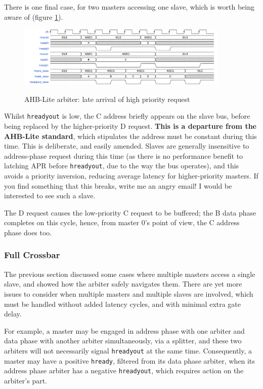 \documentclass[notitlepage]{article}
\begin{document}
There is one final case, for two masters accessing one slave, which is worth being aware of (figure \ref{diagram:ahbl_mm_latearrival}).

\begin{figure}[H]
\centering
\caption{AHB-Lite arbiter: late arrival of high priority request}
\includegraphics[width=0.9\textwidth]{waves/ahbl_mm_latearrival.pdf}
\label{diagram:ahbl_mm_latearrival}
\end{figure}

Whilst {\tt hreadyout} is low, the C address briefly appears on the slave bus, before being replaced by the higher-priority D request. \textbf{This is a departure from the AHB-Lite standard}, which stipulates the address must be constant during this time. This is deliberate, and easily amended. Slaves are generally insensitive to address-phase request during this time (as there is no performance benefit to latching APR before {\tt hreadyout}, due to the way the bus operates), and this avoids a priority inversion, reducing average latency for higher-priority masters. If you find something that this breaks, write me an angry email! I would be interested to see such a slave.

The D request causes the low-priority C request to be buffered; the B data phase completes on this cycle, hence, from master 0's point of view, the C address phase does too.

\subsubsection{Full Crossbar}

The previous section discussed some cases where multiple masters access a single slave, and showed how the arbiter safely navigates them. There are yet more issues to consider when multiple masters and multiple slaves are involved, which must be handled without added latency cycles, and with minimal extra gate delay.

For example, a master may be engaged in address phase with one arbiter and data phase with another arbiter simultaneously, via a splitter, and these two arbiters will not necessarily signal {\tt hreadyout} at the same time. Consequently, a master may have a positive {\tt hready}, filtered from its data phase arbiter, when its address phase arbiter has a negative {\tt hreadyout}, which requires action on the arbiter's part.
\end{document}
